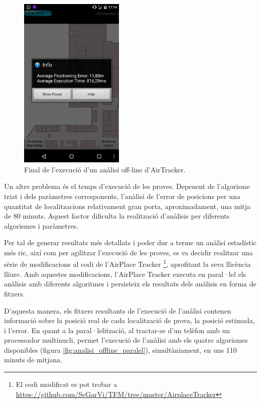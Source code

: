 \begin{figure}[ht]
\begin{center}
\includegraphics[width=5cm]{imatges/analisi_offline_defecte.png}
\caption{Final de l'execució d'un anàlisi off-line d'AirTracker.}
\label{fig:analisi_offline_defecte}
\end{center}
\end{figure}

Un altre problema és el temps d'execució de les proves. Depenent de l'algorisme triat i dels paràmetres corresponents, l'anàlisi de l'error de posicions per una quantitat de localitzacions relativament gran porta, aproximadament, una mitja de 80 minuts. Aquest factor dificulta la realització d'anàlisis per diferents algorismes i paràmetres.

Per tal de generar resultats més detallats i poder dur a terme un anàlisi estadístic més ric, així com per agilitzar l'execució de les proves, es va decidir realitzar una sèrie de modificacions al codi de l'AirPlace Tracker \footnote{El codi modificat es pot trobar a \url{https://github.com/SeGarVi/TFM/tree/master/AirplaceTracker}}, aprofitant la seva llicència lliure. Amb aquestes modificacions, l'AirPlace Tracker executa en paral·lel els anàlisis amb diferents algoritmes i persisteix els resultats dels anàlisis en forma de fitxers.

D'aquesta manera, els fitxers resultants de l'execució de l'anàlisi contenen informació sobre la posició real de cada localització de prova, la posició estimada, i l'error. En quant a la paral·lelització, al tractar-se d'un telèfon amb un processador multinucli, permet l'execució de l'anàlisi amb els quatre algorismes disponibles (figura \ref{fig:analisi_offline_paralel}), simultàniament, en uns 110 minuts de mitjana.

